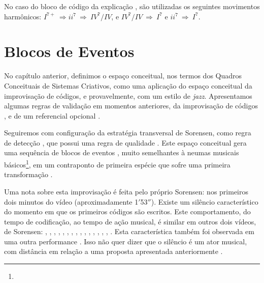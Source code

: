 No caso do bloco de código da explicação , são utilizadas os seguintes movimentos harmônicos: $I^{7+}~\Rightarrow ii^{7}~\Rightarrow~IV^{7}/IV$, e $IV^{7}/IV~\Rightarrow~I^{7}$ e $ii^{7}~\Rightarrow~I^{7}$.



\section{Blocos de Eventos}\label{sec:eventos}

No capítulo anterior, definimos o espaço conceitual, nos termos dos Quadros Conceituais de Sistemas Criativos, como uma aplicação do espaço conceitual da improvisação de códigos, e provavelmente, com um estilo de \emph{jazz}. Apresentamos algumas regras de validação em momentos anteriores, da improvisação de códigos , e de um referencial opcional .

Seguiremos com configuração da estratégia transversal de Sorensen, como regra de detecção , que possui uma regra de qualidade  . Este espaço conceitual gera uma sequência de blocos de eventos , muito semelhantes à neumas musicais básicos\footnote{}, em um contraponto de primeira espécie que sofre uma primeira transformação . 

Uma nota sobre esta improvisação é feita pelo próprio Sorensen: nos primeiros dois minutos do vídeo (aproximadamente 1$'$53$''$). Existe um silêncio característico do momento em que os primeiros códigos são escritos. Este comportamento, do tempo de codificação, ao tempo de ação musical, é similar em outros dois vídeos, de Sorensen: , , , , , ,  , , , , , ,  , , , . Esta característica também foi observada em uma outra performance . Isso não quer dizer que o silêncio é um ator musical, com distância em relação a uma proposta apresentada anteriormente . 


